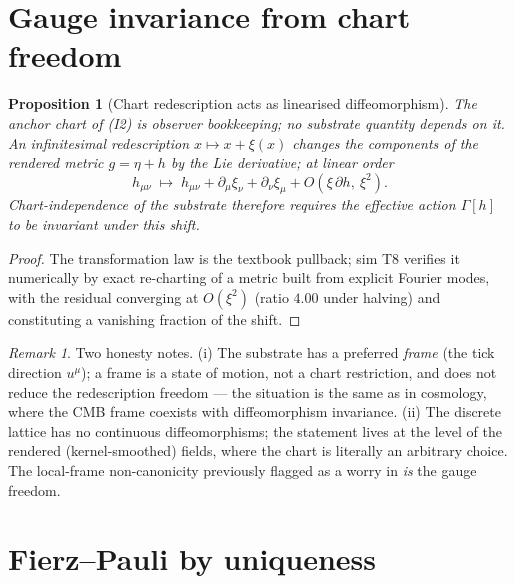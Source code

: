 \documentclass[12pt]{article}
\newtheorem{proposition}[theorem]{Proposition}
\theoremstyle{definition}
\theoremstyle{remark}
\newtheorem{remark}[theorem]{Remark}
\begin{document}
\section{Gauge invariance from chart freedom}\label{sec:gauge}

\begin{proposition}[Chart redescription acts as linearised diffeomorphism]\label{prop:chart}
The anchor chart of (I2) is observer bookkeeping; no substrate quantity depends on it. An infinitesimal redescription $x \mapsto x + \xi(x)$ changes the components of the rendered metric $g = \eta + h$ by the Lie derivative; at linear order
\begin{equation}
h_{\mu\nu} \;\longmapsto\; h_{\mu\nu} + \partial_\mu \xi_\nu + \partial_\nu \xi_\mu + O(\xi\,\partial h,\ \xi^2).
\end{equation}
Chart-independence of the substrate therefore requires the effective action $\Gamma[h]$ to be invariant under this shift.
\end{proposition}

\begin{proof}
The transformation law is the textbook pullback; sim T8 verifies it numerically by exact re-charting of a metric built from explicit Fourier modes, with the residual converging at $O(\xi^2)$ (ratio $4.00$ under halving) and constituting a vanishing fraction of the shift.
\end{proof}

\begin{remark}
Two honesty notes. (i) The substrate has a preferred \emph{frame} (the tick direction $u^\mu$); a frame is a state of motion, not a chart restriction, and does not reduce the redescription freedom --- the situation is the same as in cosmology, where the CMB frame coexists with diffeomorphism invariance. (ii) The discrete lattice has no continuous diffeomorphisms; the statement lives at the level of the rendered (kernel-smoothed) fields, where the chart is literally an arbitrary choice. The local-frame non-canonicity previously flagged as a worry in \citep{SmartKappa} \emph{is} the gauge freedom.
\end{remark}

\section{Fierz--Pauli by uniqueness}\label{sec:unique}
\end{document}
